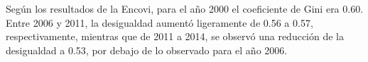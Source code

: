  Según los resultados de la Encovi, para el año 2000 el coeficiente de Gini era 0.60. Entre 2006 y 2011, la desigualdad aumentó ligeramente de 0.56 a 0.57, respectivamente, mientras que de 2011 a 2014, se observó una reducción de la desigualdad a 0.53, por debajo de lo observado para el año 2006.